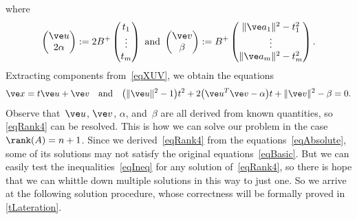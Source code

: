 \documentclass[reqno]{amsart}
\begin{document}
where
\begin{equation} \label{eqUV}%
  \begin{pmatrix}
    \ve u \\
    2 \alpha
  \end{pmatrix} := 2 B^+
  \begin{pmatrix}
    t_1 \\
    \vdots \\
    t_m
  \end{pmatrix} \ \text{and} \
  \begin{pmatrix}
    \ve v \\
    \beta
  \end{pmatrix} := B^+
  \begin{pmatrix}
    \lVert\ve a_1\rVert^2 - t_1^2 \\
    \vdots \\
    \lVert\ve a_m\rVert^2 - t_m^2
  \end{pmatrix}.
\end{equation}
Extracting components from~\eqref{eqXUV}, we obtain the equations
\begin{equation} \label{eqRank4}%
  \ve x = t \ve u + \ve v \quad \text{and} \quad \bigl(\lVert\ve
  u\rVert^2-1\bigr) t^2 + 2 \bigl(\ve u^T \ve v-\alpha\bigr) t +
  \lVert\ve v\rVert^2 - \beta = 0.
\end{equation}
Observe that~$\ve u$, $\ve v$, $\alpha$, and~$\beta$ are all derived
from known quantities, so \eqref{eqRank4} can be resolved. This is how we can solve our problem in the case $\rank(A) =
n+1$. Since we derived~\eqref{eqRank4} from the
equations~\eqref{eqAbsolute}, some of its solutions may not satisfy
the original equations~\eqref{eqBasic}. But we can easily test the
inequalities~\eqref{eqIneq} for any solution of~\eqref{eqRank4}, so
there is hope that we can whittle down multiple solutions in this way
to just one. So we arrive at the following solution procedure, whose correctness will be formally proved in \cref{tLateration}.
\end{document}
